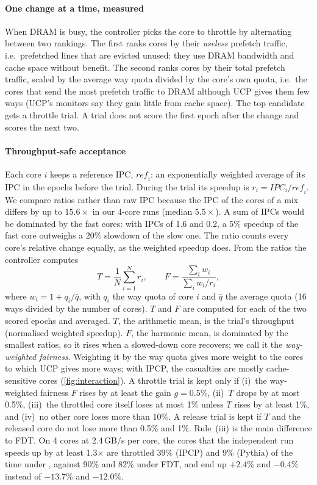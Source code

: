 \paragraph{One change at a time, measured}
When DRAM is busy, the controller picks the core to throttle by alternating between two rankings.  The first
ranks cores by their \emph{useless} prefetch traffic, i.e.\ prefetched lines that are evicted unused: they use DRAM bandwidth and cache space without
benefit.  The second ranks cores
by their total prefetch traffic, scaled by the average way quota divided by the core's own quota, i.e.\ the cores
that send the most prefetch traffic to DRAM although UCP gives them few ways (UCP's monitors say they gain little
from cache space).  The top candidate gets a throttle trial.  A trial does not score the first epoch after the change and scores the next two.

\paragraph{Throughput-safe acceptance}
Each core $i$ keeps a reference IPC, $\mathit{ref}_i$: an exponentially weighted average of its IPC in the epochs
before the trial.  During the trial its speedup is $r_i=\mathit{IPC}_i/\mathit{ref}_i$.  We compare ratios rather than
raw IPC because the IPC of the cores of a mix differs by up to $15.6\times$ in our 4-core runs (median $5.5\times$).  A sum of IPCs would be dominated by the
fast cores: with IPCs of 1.6 and 0.2, a 5\% speedup of the fast core outweighs a 20\% slowdown of the slow one.  The ratio counts every core's relative change equally, as the weighted speedup does.
From the ratios the controller computes
\[
  T = \frac{1}{N}\sum_{i=1}^{N} r_i, \qquad
  F = \frac{\sum_i w_i}{\sum_i w_i/r_i},
\]
where $w_i = 1 + q_i/\bar q$, with $q_i$ the way quota of core $i$ and $\bar q$ the average quota (16 ways divided
by the number of cores).  $T$ and $F$ are computed for each of the two scored epochs and averaged.
$T$, the arithmetic mean, is the trial's throughput (normalised weighted speedup).  $F$, the harmonic mean, is
dominated by the smallest ratios, so it rises when a slowed-down core recovers; we call it the \emph{way-weighted fairness}.  Weighting it by
the way quota gives more weight to the cores to which UCP gives more ways; with IPCP, the casualties are mostly
cache-sensitive cores (\cref{fig:interaction}).  A throttle trial
is kept only if (i)~the way-weighted fairness $F$ rises by at least the gain $g=0.5\%$, (ii)~$T$ drops by at most 0.5\%, (iii)~the throttled
core itself loses at most 1\% unless $T$ rises by at least 1\%, and (iv)~no other core loses more than 10\%.  A
release trial is kept if $T$ and the released core do not lose more than 0.5\% and 1\%.  Rule~(iii) is the main difference to FDT.  On 4 cores at 2.4\,GB/s per core, the cores that the independent run
speeds up by at least 1.3$\times$ are throttled 39\% (IPCP) and 9\% (Pythia) of the time under \vthree{}, against
90\% and 82\% under FDT, and end up $+2.4\%$ and $-0.4\%$ instead of $-13.7\%$ and $-12.0\%$.

